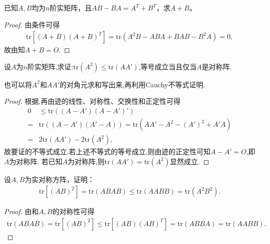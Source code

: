 \documentclass[../../main.tex]{subfiles}%
\begin{document}
\begin{example}
已知\( A,B \)均为\( n \)阶实矩阵，且\( AB - BA = A^{T} + B^{T} \)，求\( A + B \)。
\end{example}
\begin{proof}
由条件可得
\begin{align*}
\mathrm{tr}\left[ \left( A+B \right) \left( A+B \right) ^T \right] =\mathrm{tr}\left( A^2B-ABA+BAB-B^2A \right) =0,
\end{align*}
故由知$A+B=O.$
\end{proof}

\begin{proposition}\label{proposition:矩阵迹的不等式}
设\(A\)为\(n\)阶实矩阵,求证:\(\mathrm{tr}(A^2)\leqslant \mathrm{tr}(AA')\),等号成立当且仅当\(A\)是对称阵.
\end{proposition}
\begin{note}
也可以将$A^2$和$AA'$的对角元求和写出来,再利用Cauchy不等式证明.
\end{note}
\begin{proof}
根据,再由迹的线性、对称性、交换性和正定性可得
\begin{align*}
0&\leqslant \mathrm{tr}((A - A')(A - A')')\\
=&\mathrm{tr}((A - A')(A' - A))=\mathrm{tr}(AA' - A^2 - (A')^2 + A'A)\\
=&2\mathrm{tr}(AA') - 2\mathrm{tr}(A^2),
\end{align*}
故要证的不等式成立.若上述不等式的等号成立,则由迹的正定性可知\(A - A' = O\),即\(A\)为对称阵.
若已知$A$为对称阵,则$\mathrm{tr}(AA') = \mathrm{tr}(A^2)$显然成立.
\end{proof}

\begin{example}
设$A,B$为实对称方阵，证明：
\begin{align*}
\mathrm{tr}\left[ \left( AB \right) ^2 \right] =\mathrm{tr}\left( ABAB \right) \leqslant \mathrm{tr}\left( AABB \right) =\mathrm{tr}\left( A^2B^2 \right) .
\end{align*}
\end{example}
\begin{proof}
由和$A,B$的对称性可得
\begin{align*}
\mathrm{tr}\left( ABAB \right) =\mathrm{tr}\left[ \left( AB \right) ^2 \right] \leqslant \mathrm{tr}\left[ \left( AB \right) \left( AB \right) ^T \right] =\mathrm{tr}\left( ABBA \right) =\mathrm{tr}\left( AABB \right) .
\end{align*}
\end{proof}
\end{document}
